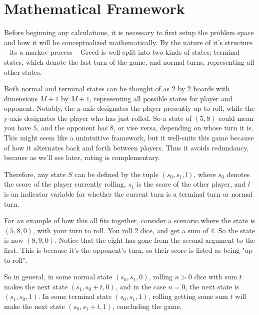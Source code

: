 \documentclass[a4paper]{article}
\begin{document}

\section{Mathematical Framework}

Before beginning any calculations, it is necessary to first setup the problem space and how it will be conceptualized mathematically. By the nature of it's structure -- its a markov process -- Greed is well-split into two kinds of states; terminal states, which denote the last turn of the game, and normal turns, representing all other states. 

Both normal and terminal states can be thought of as 2 by 2 boards with dimensions $M+1$ by $M+1$, representing all possible states for player and opponent. Notably, the x-axis designates the player presently up to roll, while the y-axis designates the player who has just rolled. So a state of $(5, 8)$ could mean you have $5$, and the opponent has $8$, or vise versa, depending on whose turn it is. This might seem like a unintuitive framework, but it well-suits this game because of how it alternates back and forth between players. Thus it avoids redundancy, because as we'll see later, rating is complementary.

Therefore, any state $S$ can be defined by the tuple $(s_0, s_1, l)$, where $s_0$ denotes the score of the player currently rolling, $s_1$ is the score of the other player, and $l$ is an indicator variable for whether the current turn is a terminal turn or normal turn.

For an example of how this all fits together, consider a scenario where the state is $(5, 8, 0)$, with your turn to roll. You roll 2 dice, and get a sum of 4. So the state is now $(8, 9, 0)$. Notice that the eight has gone from the second argument to the first. This is because it's the opponent's turn, so their score is listed as being "up to roll". 

So in general, in some normal state $(s_0, s_1, 0)$, rolling $n > 0$ dice with sum $t$ makes the next state $(s_1, s_0 + t, 0)$, and in the case $n = 0$, the next state is $(s_1, s_0, 1)$. In some terminal state $(s_0, s_1, 1)$, rolling getting some sum $t$ will make the next state $(s_0, s_1 + t, 1)$, concluding the game.

\end{document}
